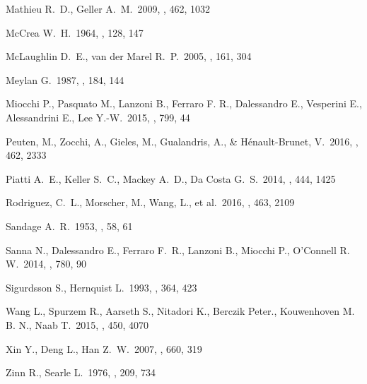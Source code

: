 \documentclass[useAMS,usenatbib,twocolumn]{mnras}
\begin{document}
\begin{thebibliography}{57}
 Mathieu R.~D., Geller A.~M.\ 2009, \nat, 462, 1032 

 McCrea W.~H.\ 1964, \mnras, 128, 147 

 McLaughlin D.~E., van der Marel R.~P.\ 2005, \apjs, 161, 304 

 Meylan G.\ 1987, \aap, 184, 144 

 Miocchi P., Pasquato M., Lanzoni B.,  Ferraro F. R., Dalessandro E., Vesperini E., Alessandrini E., Lee Y.-W.\ 2015, \apj, 799, 44 

 Peuten, M., Zocchi, A., Gieles, M., Gualandris, A., \& H{\'e}nault-Brunet, V.\ 2016, \mnras, 462, 2333 

 Piatti A.~E., Keller S.~C., Mackey A.~D., Da Costa G.~S.\ 2014, \mnras, 444, 1425 

 Rodriguez, C.~L., Morscher, M., Wang, L., et al.\ 2016, \mnras, 463, 2109 

 Sandage A.~R.\ 1953, \aj, 58, 61

 Sanna N., Dalessandro E., Ferraro F.~R., Lanzoni B., Miocchi P., O'Connell R. W.\ 2014, \apj, 780, 90 

 Sigurdsson S., Hernquist L.\ 1993, \nat, 364, 423 

 Wang L., Spurzem R., Aarseth S., Nitadori K., Berczik Peter.,  Kouwenhoven M. B. N., Naab T.\ 2015, \mnras, 450, 4070 

 Xin Y., Deng L., Han Z.~W.\ 2007, \apj, 660, 319

 Zinn R., Searle L.\ 1976, \apj, 209, 734 

\end{thebibliography}
 

\label{lastpage}
\end{document}
